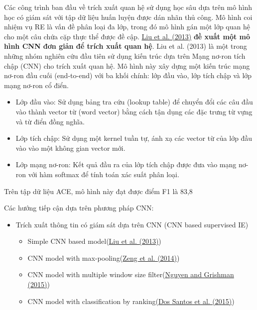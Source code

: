 \begin{singlespace}
    Các công trình ban đầu về trích xuất quan hệ sử dụng học sâu dựa trên mô hình học có giám sát
    với tập dữ liệu huấn luyện được dán nhãn thủ công. Mô hình coi nhiệm vụ RE là vấn đề phân loại
    đa lớp, trong đó mô hình gán một lớp quan hệ cho một câu chứa cặp thực thể được đề cập.
    \href{https://scholar.google.com/scholar_lookup?title=Convolution%20neural%20network%20for%20relation%20extraction&publication_year=2013&author=C.%20Liu&author=W.%20Sun&author=W.%20Chao&author=W.%20Che}{Liu et al. (2013)} \textbf{đề xuất một mô hình CNN đơn giản để trích xuất quan hệ}.
    Liu et al. (2013) là một trong những nhóm nghiên cứu đầu tiên sử dụng kiến trúc dựa trên Mạng nơ-ron tích chập (CNN) cho trích xuất quan hệ. Mô hình này xây dựng một kiến trúc mạng nơ-ron đầu cuối (end-to-end) với ba khối chính: lớp đầu vào, lớp tích chập và lớp mạng nơ-ron cổ điển.
    \begin{itemize}
        \item Lớp đầu vào: Sử dụng bảng tra cứu (lookup table) để chuyển đổi các câu đầu vào thành vector từ (word vector) bằng cách tận dụng các đặc trưng từ vựng và từ điển đồng nghĩa.
        \item Lớp tích chập: Sử dụng một kernel tuần tự, ánh xạ các vector từ của lớp đầu vào vào một không gian vector mới.
        \item Lớp mạng nơ-ron: Kết quả đầu ra của lớp tích chập được đưa vào mạng nơ-ron với hàm softmax để tính toán xác suất phân loại.
    \end{itemize}
    Trên tập dữ liệu ACE, mô hình này đạt được điểm F1 là 83,8%
\end{singlespace}

Các hướng tiếp cận dựa trên phương pháp CNN:
\begin{itemize}
    \item Trích xuất thông tin có giám sát dựa trên CNN (CNN based supervised IE)
    \begin{itemize}
        \item Simple CNN based model(\href{https://scholar.google.com/scholar_lookup?title=Convolution%20neural%20network%20for%20relation%20extraction&publication_year=2013&author=C.%20Liu&author=W.%20Sun&author=W.%20Chao&author=W.%20Che}{Liu et al. (2013)})
        \item CNN model with max-pooling(\href{https://www.scopus.com/inward/record.url?eid=2-s2.0-84959862537&partnerID=10&rel=R3.0.0}{Zeng et al. (2014)})
        \item CNN model with multiple window size filter(\href{https://www.sciencedirect.com/science/article/pii/S2667305323000698#br1010}{Nguyen and Grishman (2015)})
        \item CNN model with classification by ranking(\href{https://www.sciencedirect.com/science/article/pii/S2667305323000698#br0330}{Dos Santos et al. (2015)})
    \end{itemize}
\end{itemize}

